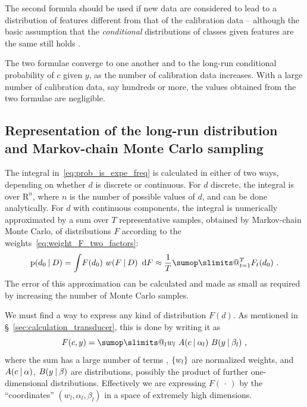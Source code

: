 \documentclass[a4paper,12pt,%
onecolumn,oneside,article,%
british%
]{memoir}
\makeatletter
\def\sum{\DOTSI\sumop\slimits@}
\newcommand*{\wrench}{{\fontencoding{U}\fontfamily{fontawesomethree}\selectfont\symbol{114}}}
\newcommand{\mynotew}[1]{{\footnotesize\color{notecolour}\wrench\ #1}}
\newcommand*{\di}{\mathop{}\!\mathrm{d}}%
\newcommand*{\RR}{\bm{\mathrm{R}}}
\newcommand*{\dotv}{\mathord{\,\cdot\,}}%
\DeclarePairedDelimiter\set{\{}{\}} %
\newcommand*{\p}{\mathrm{p}}%
\renewcommand*{\|}[1][]{\nonscript\:#1\vert\nonscript\:\mathopen{}}
\newcommand*{\sect}{\S}%
\newcommand*{\wf}{w}
\makeatother
\begin{document}
The second formula should be used if new data are considered to lead to a  distribution of features different from that of the calibration data -- although the basic assumption that the \emph{conditional} distributions of classes given features are the same still holds \autocites[see][for a thorough discussion of these two cases]{lindleyetal1981}.

The two formulae converge to one another and to the long-run conditional probability of $c$ given $y$, as the number of calibration data increases. With a large number of calibration data, say hundreds or more, the values obtained from the two formulae are negligible.

\subsection{Representation of the long-run distribution and Markov-chain Monte Carlo sampling}
\label{sec:MCMC}

The integral in~\eqref{eq:prob_is_expe_freq} is calculated in either of two ways, depending on whether $d$ is discrete or continuous. For $d$ discrete, the integral is over $\RR^{n}$, where $n$ is the number of possible values of $d$, and can be done analytically. For $d$ with continuous components, the integral is numerically approximated by a sum over $T$ representative samples, obtained by Markov-chain Monte Carlo, of distributions $F$ according to the weights~\eqref{eq:weight_F_two_factors}:
\begin{equation}
  \label{eq:MC_approx}
  \p(d_{0} \| D) = \int\! F(d_{0})\ \wf(F \| D)\ \di F
  \approx
\frac{1}{T}\sum_{t=1}^{T} F_{t}(d_{0}) \ .  
\end{equation}
The error of this approximation can be calculated and made as small as required by increasing the number of Monte Carlo samples.


We must find a way to express any kind of distribution $F(d)$. As mentioned in \sect~\ref{sec:calculation_transducer}, this is done by writing it as
\begin{equation}
  \label{eq:representation_F}
  F(c, y) = \sum_{l} w_{l}\ A(c \| \alpha_{l})\ B(y \| \beta_{l}) \ ,
\end{equation}
where the sum has a large number of terms \autocites[see][on why the number of terms does not need to be infinite]{ishwaranetal2002b}, $\set{w_{l}}$ are normalized weights, and $A(c\|\alpha)$, $B(y \| \beta)$ are distributions, possibly the product of further one-dimensional distributions. Effectively we are expressing $F(\dotv)$ by the \enquote{coordinates} $(w_{l}, \alpha_{l}, \beta_{l})$ in a space of extremely high dimensions.
\end{document}
